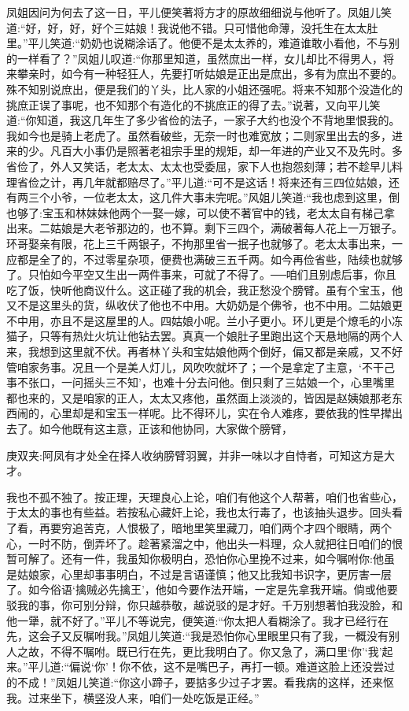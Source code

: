 \begin{parag}
    凤姐因问为何去了这一日，平儿便笑著将方才的原故细细说与他听了。凤姐儿笑道:“好，好，好，好个三姑娘！我说他不错。只可惜他命薄，没托生在太太肚里。”平儿笑道:“奶奶也说糊涂话了。他便不是太太养的，难道谁敢小看他，不与别的一样看了？”凤姐儿叹道:“你那里知道，虽然庶出一样，女儿却比不得男人，将来攀亲时，如今有一种轻狂人，先要打听姑娘是正出是庶出，多有为庶出不要的。殊不知别说庶出，便是我们的丫头，比人家的小姐还强呢。将来不知那个没造化的挑庶正误了事呢，也不知那个有造化的不挑庶正的得了去。”说著，又向平儿笑道:“你知道，我这几年生了多少省俭的法子，一家子大约也没个不背地里恨我的。我如今也是骑上老虎了。虽然看破些，无奈一时也难宽放；二则家里出去的多，进来的少。凡百大小事仍是照著老祖宗手里的规矩，却一年进的产业又不及先时。多省俭了，外人又笑话，老太太、太太也受委屈，家下人也抱怨刻薄；若不趁早儿料理省俭之计，再几年就都赔尽了。”平儿道:“可不是这话！将来还有三四位姑娘，还有两三个小爷，一位老太太，这几件大事未完呢。”风姐儿笑道:“我也虑到这里，倒也够了:宝玉和林妹妹他两个一娶一嫁，可以使不著官中的钱，老太太自有梯己拿出来。二姑娘是大老爷那边的，也不算。剩下三四个，满破著每人花上一万银子。环哥娶亲有限，花上三千两银子，不拘那里省一抿子也就够了。老太太事出来，一应都是全了的，不过零星杂项，便费也满破三五千两。如今再俭省些，陆续也就够了。只怕如今平空又生出一两件事来，可就了不得了。──咱们且别虑后事，你且吃了饭，快听他商议什么。这正碰了我的机会，我正愁没个膀臂。虽有个宝玉，他又不是这里头的货，纵收伏了他也不中用。大奶奶是个佛爷，也不中用。二姑娘更不中用，亦且不是这屋里的人。四姑娘小呢。兰小子更小。环儿更是个燎毛的小冻猫子，只等有热灶火坑让他钻去罢。真真一个娘肚子里跑出这个天悬地隔的两个人来，我想到这里就不伏。再者林丫头和宝姑娘他两个倒好，偏又都是亲戚，又不好管咱家务事。况且一个是美人灯儿，风吹吹就坏了；一个是拿定了主意，‘不干己事不张口，一问摇头三不知’，也难十分去问他。倒只剩了三姑娘一个，心里嘴里都也来的，又是咱家的正人，太太又疼他，虽然面上淡淡的，皆因是赵姨娘那老东西闹的，心里却是和宝玉一样呢。比不得环儿，实在令人难疼，要依我的性早撵出去了。如今他既有这主意，正该和他协同，大家做个膀臂，\begin{note}庚双夹:阿凤有才处全在择人收纳膀臂羽翼，并非一味以才自恃者，可知这方是大才。\end{note}我也不孤不独了。按正理，天理良心上论，咱们有他这个人帮著，咱们也省些心，于太太的事也有些益。若按私心藏奸上论，我也太行毒了，也该抽头退步。回头看了看，再要穷追苦克，人恨极了，暗地里笑里藏刀，咱们两个才四个眼睛，两个心，一时不防，倒弄坏了。趁著紧溜之中，他出头一料理，众人就把往日咱们的恨暂可解了。还有一件，我虽知你极明白，恐怕你心里挽不过来，如今嘱咐你:他虽是姑娘家，心里却事事明白，不过是言语谨慎；他又比我知书识字，更厉害一层了。如今俗语‘擒贼必先擒王’，他如今要作法开端，一定是先拿我开端。倘或他要驳我的事，你可别分辩，你只越恭敬，越说驳的是才好。千万别想著怕我没脸，和他一犟，就不好了。”平儿不等说完，便笑道:“你太把人看糊涂了。我才已经行在先，这会子又反嘱咐我。”凤姐儿笑道:“我是恐怕你心里眼里只有了我，一概没有别人之故，不得不嘱咐。既已行在先，更比我明白了。你又急了，满口里‘你’‘我’起来。”平儿道:“偏说‘你’！你不依，这不是嘴巴子，再打一顿。难道这脸上还没尝过的不成！”凤姐儿笑道:“你这小蹄子，要掂多少过子才罢。看我病的这样，还来怄我。过来坐下，横竖没人来，咱们一处吃饭是正经。”
\end{parag}


